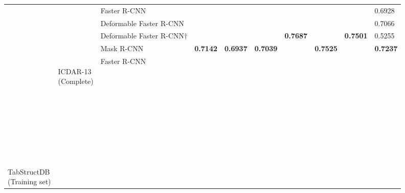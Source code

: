 \documentclass{ieeeaccess}
\begin{document}
\begin{table*}
\begin{tabularx}{\linewidth}{|u|u|t|v|v|k|v|v|k|k|}
        & \footnotesize {}&
        \footnotesize  Faster R-CNN&
        \footnotesize {}&
        \footnotesize {}&
        \footnotesize {}&
        \footnotesize {}&
        \footnotesize {}&
        \footnotesize {}&
        \footnotesize 
        {0.6928} \\
        & &\footnotesize  Deformable Faster R-CNN &
        
        \footnotesize {}&
        \footnotesize {}&
        \footnotesize {}&
        \footnotesize {}&
        \footnotesize {}&
        \footnotesize {}&
        \footnotesize {0.7066} \\
         & &\footnotesize  Deformable Faster R-CNN$\dagger$&
        \footnotesize {}&
        \footnotesize {}&
        \footnotesize {}&
        \footnotesize \centering \textbf{0.7687}&
        \footnotesize {}&
        \footnotesize \centering \textbf{0.7501}&
        \footnotesize {0.5255} \\
        & &\footnotesize  Mask R-CNN&
        \footnotesize \centering \textbf{0.7142}&
        \footnotesize \centering \textbf{0.6937}&
        \footnotesize \centering \textbf{0.7039}&
        \footnotesize {}&
        \footnotesize \centering \textbf{0.7525}&
        \footnotesize {}&
        \footnotesize 
        \textbf{0.7237} \\
        \hline


        \footnotesize {} {\newline \newline \newline\newline \newline \newline \newline \newline \newline \newline \newline TabStructDB \newline (Training set)}&
        \footnotesize {} {\newline ICDAR-13 \newline (Complete)}&
        \footnotesize  Faster R-CNN&
        

\end{tabularx}
\end{table*}
\end{document}
